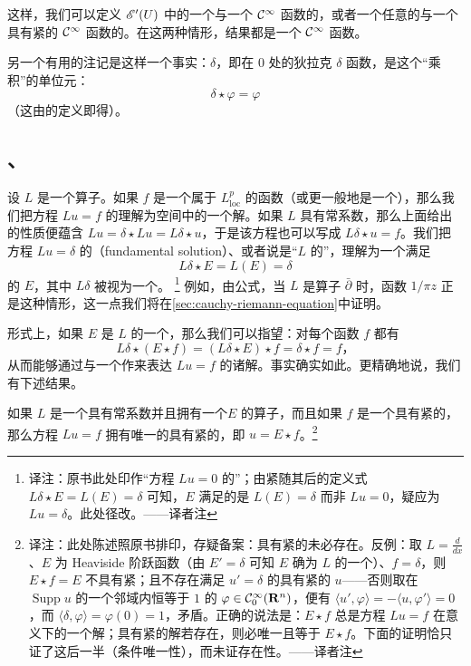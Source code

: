 这样，我们可以定义 $\mathscr{E}'(U)$ 中的一个\trDistribution{}与一个 $\mathcal{C}^{\infty}$ 函数的\trConvolution，或者一个任意的\trDistribution{}与一个具有紧\trSupport{}的 $\mathcal{C}^{\infty}$ 函数的\trConvolution。在这两种情形，结果都是一个 $\mathcal{C}^{\infty}$ 函数。

另一个有用的注记是这样一个事实：$\delta$，即在 $0$ 处的狄拉克 $\delta$ 函数，是这个“乘积”的单位元：
\[
\delta\star\varphi=\varphi
\]
（这由\trConvolution{}的定义即得）。

\subsection{\trFundamentalSolution、\trWeakSolution}
\label{subsec:fundamental-solution-weak-solutions}

设 $L$ 是一个\trDifferential{}算子。如果 $f$ 是一个属于 $L^{p}_{\mathrm{loc}}$ 的函数（或更一般地是一个\trDistribution），那么我们把方程 $Lu=f$ 的\trWeakSolution{}理解为\trDistribution{}空间中的一个解。如果 $L$ 具有常系数，那么上面给出的\trConvolution{}性质便蕴含 $Lu=\delta\star Lu=L\delta\star u$，于是该方程也可以写成 $L\delta\star u=f$。我们把方程 $Lu=\delta$ 的\trFundamentalSolution（fundamental solution）、或者说是“$L$ 的\trFundamentalSolution”，理解为一个满足
\[
L\delta\star E=L(E)=\delta
\]
的\trDistribution{} $E$，其中 $L\delta$ 被视为一个\trDistribution。%
\footnote{译注：原书此处印作“方程 $Lu=0$ 的\trFundamentalSolution”；由紧随其后的定义式 $L\delta\star E=L(E)=\delta$ 可知，$E$ 满足的是 $L(E)=\delta$ 而非 $Lu=0$，疑应为 $Lu=\delta$。此处径改。——译者注}
例如，由\trCauchy{}公式，当 $L$ 是算子 $\bar{\partial}$ 时，函数 $1/\pi z$ 正是这种情形，这一点我们将在\cref{sec:cauchy-riemann-equation}中证明。

形式上，如果 $E$ 是 $L$ 的一个\trFundamentalSolution，那么我们可以指望：对每个函数 $f$ 都有
\[
L\delta\star(E\star f)=(L\delta\star E)\star f=\delta\star f=f\text{，}
\]
从而能够通过与一个\trFundamentalSolution{}作\trConvolution{}来表达 $Lu=f$ 的诸解。事实确实如此。更精确地说，我们有下述结果。

\begin{theorem}[{[13,~Theorem~8.1.2]}]\label{thm:weak-solution-compact-support}
如果 $L$ 是一个具有常系数并且拥有一个\trFundamentalSolution $E$ 的\trDifferential{}算子，而且如果 $f$ 是一个具有紧\trSupport{}的\trDistribution，那么方程 $Lu=f$ 拥有唯一的具有紧\trSupport{}的\trWeakSolution，即 $u=E\star f$。\footnote{译注：此处陈述照原书排印，存疑备案：具有紧\trSupport{}的\trWeakSolution{}未必存在。反例：取 $L=\frac{d}{dx}$、$E$ 为 Heaviside 阶跃函数（由 $E'=\delta$ 可知 $E$ 确为 $L$ 的一个\trFundamentalSolution）、$f=\delta$，则 $E\star f=E$ 不具有紧\trSupport{}；且不存在满足 $u'=\delta$ 的具有紧\trSupport{}的 $u$——否则取在 $\operatorname{Supp}u$ 的一个邻域内恒等于 $1$ 的 $\varphi\in\mathcal{C}^{\infty}_{0}(\mathbf{R}^{n})$，便有 $\langle u',\varphi\rangle=-\langle u,\varphi'\rangle=0$，而 $\langle\delta,\varphi\rangle=\varphi(0)=1$，矛盾。正确的说法是：$E\star f$ 总是方程 $Lu=f$ 在\trDistribution{}意义下的一个解；具有紧\trSupport{}的解若存在，则必唯一且等于 $E\star f$。下面的证明恰只证了这后一半（条件唯一性），而未证存在性。——译者注}
\end{theorem}

